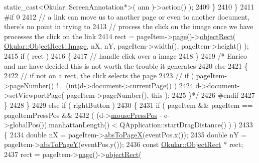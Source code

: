 \begin{DoxyCode}
      static\_cast<Okular::ScreenAnnotation*>( ann )->action() );
2409                         \}
2410                     \}
2411 \textcolor{preprocessor}{#if 0}
2412                     \textcolor{comment}{// a link can move us to another page or even to another document, there's no point in
       trying to}
2413                     \textcolor{comment}{//  process the click on the image once we have processes the click on the link}
2414                     rect = pageItem->\hyperlink{classPageViewItem_a5c512d95e5563e8d19d1fb3d93dafc31}{page}()->\hyperlink{classOkular_1_1Page_ab6a680a31a5d67861013d706d028dde7}{objectRect}( 
      \hyperlink{classOkular_1_1ObjectRect_a2f77f7653306bae90bfb68277aaafe16a1384fe70201a84f6c3554a7ca6fc84d2}{Okular::ObjectRect::Image}, nX, nY, pageItem->width(), pageItem->height() );
2415                     \textcolor{keywordflow}{if} ( rect )
2416                     \{
2417                         \textcolor{comment}{// handle click over a image}
2418                     \}
2419 \textcolor{comment}{/*      Enrico and me have decided this is not worth the trouble it generates}
2420 \textcolor{comment}{                    else}
2421 \textcolor{comment}{                    \{}
2422 \textcolor{comment}{                        // if not on a rect, the click selects the page}
2423 \textcolor{comment}{                        // if ( pageItem->pageNumber() != (int)d->document->currentPage() )}
2424 \textcolor{comment}{                        d->document->setViewportPage( pageItem->pageNumber(), this );}
2425 \textcolor{comment}{                    \}*/}
2426 \textcolor{preprocessor}{#endif}
2427                 \}
2428             \}
2429             \textcolor{keywordflow}{else} \textcolor{keywordflow}{if} ( rightButton )
2430             \{
2431                 \textcolor{keywordflow}{if} ( pageItem && pageItem == pageItemPressPos &&
2432                      ( (d->\hyperlink{classPageViewPrivate_aa4799ae3aa24957d19a95220d8f61216}{mousePressPos} - e->globalPos()).manhattanLength() < 
      QApplication::startDragDistance() ) )
2433                 \{
2434                     \textcolor{keywordtype}{double} nX = pageItem->\hyperlink{classPageViewItem_ac8c32541cbae1efd5b4ab54f0a4b4576}{absToPageX}(eventPos.x());
2435                     \textcolor{keywordtype}{double} nY = pageItem->\hyperlink{classPageViewItem_afdbba9ce015155c0e655efbb23e5d13b}{absToPageY}(eventPos.y());
2436                     \textcolor{keyword}{const} \hyperlink{classOkular_1_1ObjectRect}{Okular::ObjectRect} * rect;
2437                     rect = pageItem->\hyperlink{classPageViewItem_a5c512d95e5563e8d19d1fb3d93dafc31}{page}()->\hyperlink{classOkular_1_1Page_ab6a680a31a5d67861013d706d028dde7}{objectRect}( 

\end{DoxyCode}
